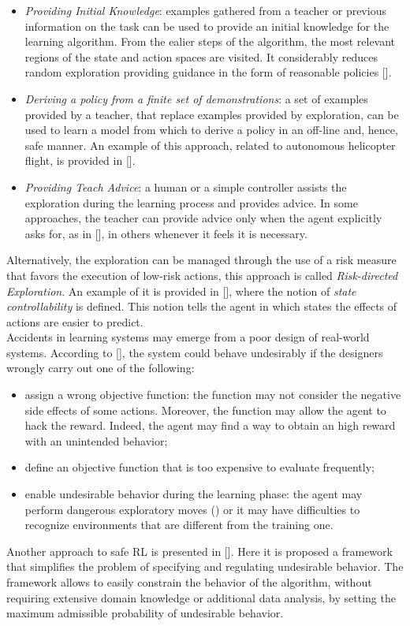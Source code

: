 \begin{itemize}
	\item \emph{Providing Initial Knowledge}: examples gathered from a teacher or previous information on the task can be used to provide an initial knowledge for the learning algorithm. From the ealier steps of the algorithm, the most relevant regions of the state and action spaces are visited. It considerably reduces random exploration providing guidance in the form of reasonable policies [\cite{driessen2004integrating}].
	\item \emph{Deriving a policy from a finite set of demonstrations}: a set of examples provided by a teacher, that replace examples provided by exploration, can be used to learn a model from which to derive a policy in an off-line and, hence, safe manner. An example of this approach, related to autonomous helicopter flight, is provided in [\cite{abbeel2010autonomous}].
	\item \emph{Providing Teach Advice}: a human or a simple controller assists the exploration during the learning process and provides advice. In some approaches, the teacher can provide advice only when the agent explicitly asks for, as in [\cite{clouse1997on}], in others whenever it feels it is necessary. 
\end{itemize}
Alternatively, the exploration can be managed through the use of a risk measure that favors the execution of low-risk actions, this approach is called \emph{Risk-directed Exploration}. An example of it is provided in [\cite{gehring2013smart}], where the notion of \emph{state controllability} is defined. This notion tells the agent in which states the effects of actions are easier to predict.\\
\newline 
Accidents in learning systems may emerge from a poor design of real-world systems. According to [\cite{amodei2016concrete}], the system could behave undesirably if the designers wrongly carry out one of the following:
\begin{itemize}
	\item assign a wrong objective function: the function may not consider the negative side effects of some actions. Moreover, the function may allow the agent to hack the reward. Indeed, the agent may find a way to obtain an high reward with an unintended behavior;
	\item define an objective function that is too expensive to evaluate frequently;
	\item enable undesirable behavior during the learning phase: the agent may perform dangerous exploratory moves () or it may have difficulties to recognize environments that are different from the training one. 
\end{itemize}
Another approach to safe \ac{RL} is presented in [\cite{thomas2019preventing}]. Here it is proposed a framework that simplifies the problem of specifying and regulating undesirable behavior. The framework allows to easily constrain the behavior of the algorithm, without requiring extensive domain knowledge or additional data analysis, by setting the maximum admissible probability of undesirable behavior.

